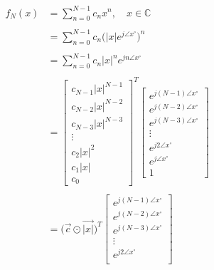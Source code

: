 \documentclass{article}
\begin{document}
\begin{align*}
    f_{N}(x)&= \sum^{N - 1}_{n = 0}c_{n}x^{n}, \quad x \in \mathbb{C} \\ \\
            &= \sum^{N - 1}_{n = 0}c_{n}\Big(|x|e^{j\angle{x}^{\circ}}\Big)^{n} \\ \\
            &= \sum^{N - 1}_{n = 0}c_{n}|x|^{n}e^{jn\angle{x}^{\circ}} \\ \\
            &= \begin{bmatrix}
                    c_{N - 1}|x|^{N - 1} \\
                    c_{N - 2}|x|^{N - 2} \\
                    c_{N - 3}|x|^{N - 3} \\
                    \vdots \\
                    c_{2}|x|^{2} \\
                    c_{1}|x| \\
                    c_{0}
                 \end{bmatrix}^{T}
               \begin{bmatrix}
                    e^{j(N - 1)\angle{x}^{\circ}} \\
                    e^{j(N - 2)\angle{x}^{\circ}} \\
                    e^{j(N - 3)\angle{x}^{\circ}} \\
                    \vdots \\
                    e^{j2\angle{x}^{\circ}} \\
                    e^{j\angle{x}^{\circ}} \\
                    1
                 \end{bmatrix} \\ \\
            &= \Big(\vec{c} \odot \vec{|x|}\Big)^{T}\begin{bmatrix}
                                                        e^{j(N - 1)\angle{x}^{\circ}} \\
                                                        e^{j(N - 2)\angle{x}^{\circ}} \\
                                                        e^{j(N - 3)\angle{x}^{\circ}} \\
                                                        \vdots \\
                                                        e^{j2\angle{x}^{\circ}} \\

\end{bmatrix}
\end{align*}
\end{document}
